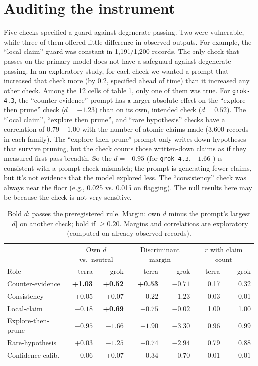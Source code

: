 \documentclass[11pt,a4paper]{article}
\begin{document}
\section{Auditing the instrument}
Five checks specified a guard against degenerate passing. Two were vulnerable, while three of them offered little difference in observed outputs. For example, the “local claim” guard was constant in 1,191/1,200 records. The only check that passes on the primary model does not have a safeguard against degenerate passing. In an exploratory study, for each check we wanted a prompt that increased that check more (by 0.2, specified ahead of time) than it increased any other check. Among the 12 cells of table \ref{tab:audit}, only one of them was true. For \texttt{grok-4.3}, the “counter-evidence” prompt has a larger absolute effect on the “explore then prune” check ($d = -1.23$) than on its own, intended check ($d = 0.52$). The “local claim”, “explore then prune”, and “rare hypothesis” checks have a correlation of $0.79-1.00$ with the number of atomic claims made (3,600 records in each family). The “explore then prune” prompt only writes down hypotheses that survive pruning, but the check counts those written-down claims as if they measured first-pass breadth. So the $d = -0.95$ (for \texttt{grok-4.3}, $-1.66$ ) is consistent with a prompt-check mismatch; the prompt is generating fewer claims, but it's not evidence that the model explored less. The “consistency” check was always near the floor (e.g., 0.025 vs. 0.015 on flagging). The null results here may be because the check is not very sensitive.

\begin{table}[htbp]
  \centering
  \small
  \begin{tabularx}{\linewidth}{@{}Xrrrrrr@{}}
    \toprule
     & \multicolumn{2}{c}{Own $d$ vs.\ neutral} & \multicolumn{2}{c}{Discriminant margin} & \multicolumn{2}{c}{$r$ with claim count} \\
    Role & terra & grok & terra & grok & terra & grok \\
    \midrule
    Counter-evidence    & \textbf{+1.03} & \textbf{+0.52} & \textbf{+0.53} & $-0.71$ & 0.17 & 0.32 \\
    Consistency         & +0.05 & +0.07 & $-0.22$ & $-1.23$ & 0.03 & 0.01 \\
    Local-claim         & $-0.18$ & \textbf{+0.69} & $-0.75$ & $-0.02$ & 1.00 & 1.00 \\
    Explore-then-prune  & $-0.95$ & $-1.66$ & $-1.90$ & $-3.30$ & 0.96 & 0.99 \\
    Rare-hypothesis     & +0.03 & $-1.25$ & $-0.74$ & $-2.94$ & 0.79 & 0.88 \\
    Confidence calib.   & $-0.06$ & +0.07 & $-0.34$ & $-0.70$ & $-0.01$ & $-0.01$ \\
    \bottomrule
  \end{tabularx}
  \caption{Bold $d$: passes the preregistered rule. Margin: own $d$ minus the
  prompt's largest $|d|$ on another check; bold if $\geq 0.20$. Margins and
  correlations are exploratory (computed on already-observed records).}
  \label{tab:audit}
\end{table}
\end{document}
